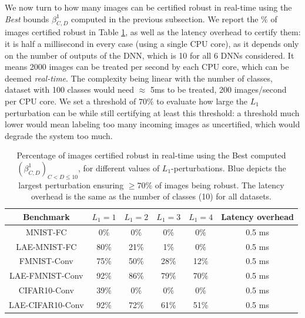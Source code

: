 We now turn to how many images can be certified robust in real-time using the {\em Best} bounds $\beta^1_{C,D}$ computed in the previous subsection. We report the $\%$ of images certified robust in Table \ref{table.cert}, as well as the latency overhead to certify them: it is half a millisecond in every case (using a single CPU core), as it depends only on the number of outputs of the DNN, which is 10 for all 6 DNNs considered. It means 2000 images can be treated per second by each CPU core, which can be deemed {\em real-time}.
The complexity being linear with the number of classes, 
dataset with 100 classes would need $\approx$ 5ms to be treated, 200 images/second per CPU core. We set a threshold of $70\%$ to evaluate how large the $L_1$ perturbation can be while still certifying at least this threshold: a threshold much lower would mean labeling too many incoming images as uncertified, which would degrade the system too much.



\begin{table}[h!]
	\centering
	\begin{tabular}{|c|cccc|c|}\hline
		Benchmark & $L_1=1$ & $L_1=2$ & $L_1=3$ & $L_1=4$ & Latency overhead 
		
		\\\hline 
		MNIST-FC  & 0$\%$ & 0$\%$ & 0$\%$ & 0$\%$ & 0.5 ms
		\\
		
		LAE-MNIST-FC  & {\color{blue} 80$\%$}  & 21$\%$ & 1$\%$ & 0$\%$ & 0.5 ms
		\\ \hline 
		
 		FMNIST-Conv & 
		{\color{blue} 75$\%$}  & 50$\%$ & 28$\%$ &	12$\%$  & 0.5 ms
		\\

		LAE-FMNIST-Conv & 
		92$\%$ &	86$\%$ &	79$\%$ & {\color{blue} 70$\%$}  & 0.5 ms
		\\\hline
		
		CIFAR10-Conv  & 39$\%$ & 0$\%$ & 0$\%$ & 0$\%$ & 0.5 ms
		\\ 
		LAE-CIFAR10-Conv  & 92$\%$ & {\color{blue} 72$\%$} & 61$\%$ & 51$\%$ & 0.5 ms
		\\\hline
	\end{tabular}

	\caption{Percentage of images certified robust in real-time 
	using the Best computed $(\beta^{1}_{C,D})_{C < D \leq 10}$, 
	for different values of $L_1$-perturbations.
	{\color{blue} Blue} depicts the largest perturbation ensuring $\geq 70\%$ of images being robust. The latency overhead is the same as the number of classes (10) for all datasets.}
    \label{table.cert}
\end{table}

